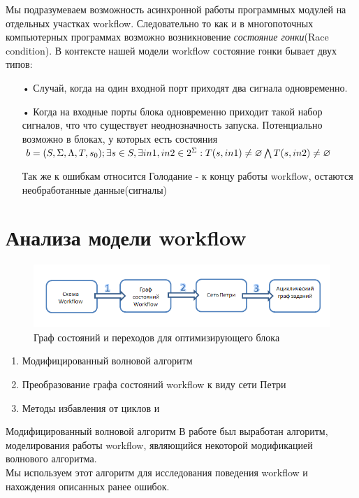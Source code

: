 \documentclass[a4paper,14pt]{article}
\begin{document}
Мы подразумеваем возможность асинхронной работы программных модулей на отдельных участках workflow. Следовательно то как и в многопоточных компьютерных программах возможно возникновение \textit{состояние гонки}(Race condition). 
В контексте нашей модели workflow состояние гонки бывает двух типов:
\begin{enumerate}
\item[•] Случай, когда на один входной порт приходят два сигнала одновременно.
\item[•] Когда на входные порты блока одновременно приходит такой набор сигналов, что что существует неоднозначность запуска.
Потенциально возможно в блоках, у которых есть состояния
$b = (S, \Sigma,\Lambda, T, s_{0});\\
 \exists s \in S , \exists in1, in2 \in 2^{\Sigma} :  T(s, in1) \neq \varnothing \bigwedge T(s, in2) \neq \varnothing$

Так же к ошибкам относится Голодание  - к концу работы workflow, остаются необработанные данные(сигналы)
\end{enumerate}

\section{Анализа модели workflow}


\begin{figure}[here]
    \centering
    \includegraphics[width=\textwidth]{analys_plan.png}
    \caption{Граф состояний и переходов для оптимизирующего блока }
    \label{img:opt_wf}
\end{figure}

\begin{enumerate}
\item Модифицированный волновой алгоритм
\item Преобразование графа состояний workflow к виду сети Петри
\item Методы избавления от циклов и 
\end{enumerate}

Модифицированный волновой алгоритм
В работе был выработан алгоритм, моделирования работы workflow, являющийся некоторой модификацией волнового алгоритма.\\
Мы используем этот алгоритм для исследования поведения workflow и нахождения описанных ранее ошибок.
\end{document}
